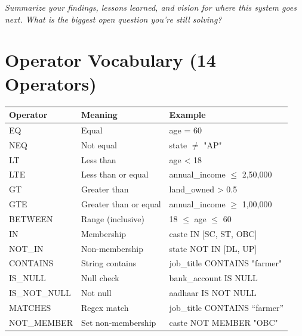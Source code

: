 \documentclass[11pt,a4paper]{report}
\newenvironment{notebox}{%
  \begin{callout}%
}{%
  \end{callout}%
}
\begin{document}
\begin{notebox}
\Large\vspace{4cm}

\noindent\textcolor{dark}{\emph{Summarize your findings, lessons learned, and vision for where this system goes next. What is the biggest open question you're still solving?}}

\vspace{4cm}
\end{notebox}

\appendix

\chapter{Operator Vocabulary (14 Operators)}

\begin{table}[H]
\centering
\small
\begin{tabular}{lp{4cm}p{2cm}}
\toprule
\textbf{Operator} & \textbf{Meaning} & \textbf{Example} \\
\midrule
EQ & Equal & age = 60 \\
NEQ & Not equal & state $\neq$ "AP" \\
LT & Less than & age < 18 \\
LTE & Less than or equal & annual\_income $\leq$ 2,50,000 \\
GT & Greater than & land\_owned > 0.5 \\
GTE & Greater than or equal & annual\_income $\geq$ 1,00,000 \\
BETWEEN & Range (inclusive) & 18 $\leq$ age $\leq$ 60 \\
IN & Membership & caste IN [SC, ST, OBC] \\
NOT\_IN & Non-membership & state NOT IN [DL, UP] \\
CONTAINS & String contains & job\_title CONTAINS "farmer" \\
IS\_NULL & Null check & bank\_account IS NULL \\
IS\_NOT\_NULL & Not null & aadhaar IS NOT NULL \\
MATCHES & Regex match & job\_title CONTAINS ``farmer'' \\
NOT\_MEMBER & Set non-membership & caste NOT MEMBER "OBC" \\
\bottomrule
\end{tabular}
\end{table}
\end{document}
